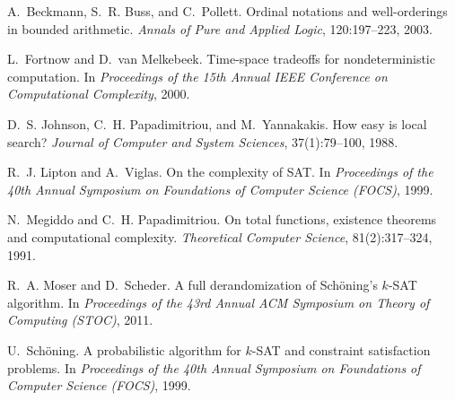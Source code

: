 
A.~Beckmann, S.~R. Buss, and C.~Pollett.
\newblock Ordinal notations and well-orderings in bounded arithmetic.
\newblock \emph{Annals of Pure and Applied Logic}, 120:197--223, 2003.

L.~Fortnow and D.~van Melkebeek.
\newblock Time-space tradeoffs for nondeterministic computation.
\newblock In \emph{Proceedings of the 15th Annual IEEE Conference on Computational Complexity},
2000.

D.~S. Johnson, C.~H. Papadimitriou, and M.~Yannakakis.
\newblock How easy is local search?
\newblock \emph{Journal of Computer and System Sciences}, 37(1):79--100, 1988.

R.~J. Lipton and A.~Viglas.
\newblock On the complexity of {SAT}.
\newblock In \emph{Proceedings of the 40th Annual Symposium on Foundations of Computer Science
(FOCS)}, 1999.

N.~Megiddo and C.~H. Papadimitriou.
\newblock On total functions, existence theorems and computational complexity.
\newblock \emph{Theoretical Computer Science}, 81(2):317--324, 1991.

R.~A. Moser and D.~Scheder.
\newblock A full derandomization of Sch{\"o}ning's $k$-{SAT} algorithm.
\newblock In \emph{Proceedings of the 43rd Annual ACM Symposium on Theory of Computing (STOC)},
2011.

U.~Sch{\"o}ning.
\newblock A probabilistic algorithm for $k$-{SAT} and constraint satisfaction problems.
\newblock In \emph{Proceedings of the 40th Annual Symposium on Foundations of Computer Science
(FOCS)}, 1999.
